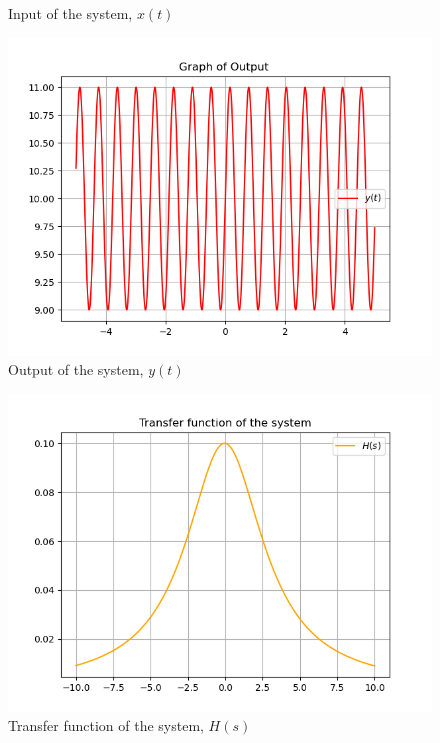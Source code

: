 \documentclass[journal,12pt,twocolumn]{IEEEtran}
\theoremstyle{remark}
\begin{document}
\begin{enumerate}
\begin{figure}[h]
    \caption{Input of the system, $x(t)$} 
\end{figure}
\begin{figure}[h]
    \centering
    \includegraphics[width=\columnwidth]{figs/output.png}
    \caption{Output of the system, $y(t)$} 
\end{figure}
\begin{figure}[h]
    \centering
    \includegraphics[width=\columnwidth]{figs/transfer.png}
    \caption{Transfer function of the system, $H(s)$} 
\end{figure}

\end{enumerate}
\end{document}
